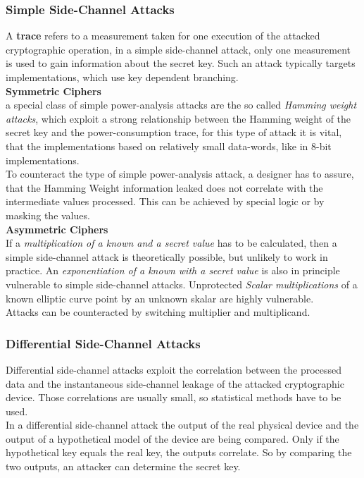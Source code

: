 \documentclass[a4paper, 10 pt, conference]{ieeeconf}
\begin{document}
\subsubsection{\textbf{Simple Side-Channel Attacks}}
\label{simpleside}
A \textbf{trace} refers to a measurement taken for one execution of the attacked cryptographic operation, in a simple side-channel attack, only one measurement is used to gain information about the secret key. Such an attack typically targets implementations, which use key dependent branching. \\
\textbf{Symmetric Ciphers}\\
a special class of simple power-analysis attacks are the so called \emph{Hamming weight attacks}, which exploit a strong relationship between the Hamming weight of the secret key and the power-consumption trace, for this type of attack it is vital, that the implementations based on relatively small data-words, like in 8-bit implementations. \\
To counteract the type of simple power-analysis attack, a designer has to assure, that the Hamming Weight information leaked does not correlate with the intermediate values processed. This can be achieved by special logic or by masking the values. \\
\textbf{Asymmetric Ciphers} \\ 
If a \emph{multiplication of a known and a secret value} has to be calculated, then a simple side-channel attack is theoretically possible, but unlikely to work in practice. An \emph{exponentiation of a known with a secret value} is also in principle vulnerable to simple side-channel attacks. Unprotected \emph{Scalar multiplications} of a known elliptic curve point by an unknown skalar are highly vulnerable. \\
Attacks can be counteracted by switching multiplier and multiplicand.

\vspace{0.5cm}
\subsubsection{\textbf{Differential Side-Channel Attacks}}
\label{diffside}
Differential side-channel attacks exploit the correlation between the processed data and the instantaneous side-channel leakage of the attacked cryptographic device. Those correlations are usually small, so statistical methods have to be used. \\
In a differential side-channel attack the output of the real physical device and the output of a hypothetical model of the device are being compared. Only if the hypothetical key equals the real key, the outputs correlate. 
So by comparing the two outputs, an attacker can determine the secret key. 
\end{document}
